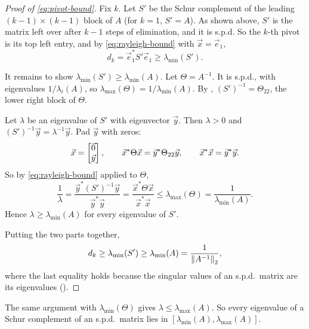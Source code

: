 \begin{proof}[Proof of \eqref{eq:pivot-bound}]
  Fix $k$. Let $S'$ be the Schur complement of the leading $(k - 1) \times (k - 1)$ block of $A$ (for $k = 1$, $S' = A$). As shown above, $S'$ is the matrix left over after $k - 1$ steps of elimination, and it is s.p.d. So the $k$-th pivot is its top left entry, and by \eqref{eq:rayleigh-bound} with $\vec{x} = \vec{e}_1$,
  \begin{equation}
    d_k = \vec{e}_1^\ast S'\vec{e}_1 \ge \lambda_{\min}(S').
  \end{equation}

  It remains to show $\lambda_{\min}(S') \ge \lambda_{\min}(A)$. Let $\Theta = A^{-1}$. It is s.p.d., with eigenvalues $1/\lambda_i(A)$, so $\lambda_{\max}(\Theta) = 1/\lambda_{\min}(A)$. By , $(S')^{-1} = \Theta_{22}$, the lower right block of $\Theta$.

  Let $\lambda$ be an eigenvalue of $S'$ with eigenvector $\vec{y}$. Then $\lambda > 0$ and $(S')^{-1}\vec{y} = \lambda^{-1}\vec{y}$. Pad $\vec{y}$ with zeros:
  \begin{equation*}
    \vec{x} = \begin{bmatrix} \vec{0} \\ \vec{y} \end{bmatrix}, \qquad
    \vec{x}^\ast\Theta\vec{x} = \vec{y}^\ast\Theta_{22}\vec{y}, \qquad
    \vec{x}^\ast\vec{x} = \vec{y}^\ast\vec{y}.
  \end{equation*}
  So by \eqref{eq:rayleigh-bound} applied to $\Theta$,
  \begin{equation*}
    \frac{1}{\lambda}
    = \frac{\vec{y}^\ast(S')^{-1}\vec{y}}{\vec{y}^\ast\vec{y}}
    = \frac{\vec{x}^\ast\Theta\vec{x}}{\vec{x}^\ast\vec{x}}
    \le \lambda_{\max}(\Theta)
    = \frac{1}{\lambda_{\min}(A)}.
  \end{equation*}
  Hence $\lambda \ge \lambda_{\min}(A)$ for every eigenvalue of $S'$.

  Putting the two parts together,
  \begin{equation}
    d_k \ge \lambda_{\min}(S') \ge \lambda_{\min}(A) = \frac{1}{\left\lVert A^{-1} \right\rVert_2},
  \end{equation}
  where the last equality holds because the singular values of an s.p.d.\ matrix are its eigenvalues ().
\end{proof}

The same argument with $\lambda_{\min}(\Theta)$ gives $\lambda \le \lambda_{\max}(A)$. So every eigenvalue of a Schur complement of an s.p.d.\ matrix lies in $[\lambda_{\min}(A), \lambda_{\max}(A)]$.


